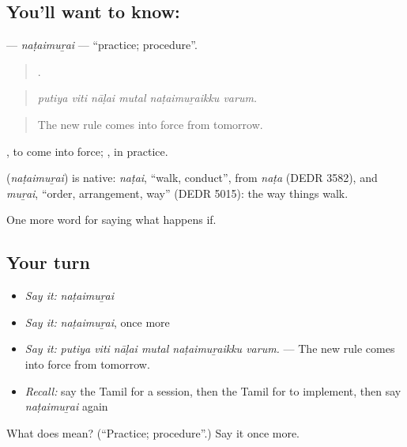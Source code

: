 \subsection*{You'll want to know: }
\textbf{} — \emph{naṭaimuṟai} — \textquotedblleft{}practice; procedure\textquotedblright{}.

\begin{quote}
     .
\end{quote}

\begin{quote}
\emph{putiya viti nāḷai mutal naṭaimuṟaikku varum.}
\end{quote}

\begin{quote}
The new rule comes into force from tomorrow.
\end{quote}

 , to come into force; , in practice.

\begin{cousinweb}
\textbf{} (\emph{naṭaimuṟai}) is native: \emph{naṭai}, \textquotedblleft{}walk, conduct\textquotedblright{}, from \emph{naṭa} (DEDR 3582), and \emph{muṟai}, \textquotedblleft{}order, arrangement, way\textquotedblright{} (DEDR 5015): the way things walk.
\end{cousinweb}

\begin{grammarlens}[title={What you've built}]
One more word for saying what happens if.
\end{grammarlens}

\subsection*{Your turn}
\begin{itemize}
\raggedright
  \item \emph{Say it:} \emph{naṭaimuṟai}
  \item \emph{Say it:} \emph{naṭaimuṟai}, once more
  \item \emph{Say it:} \emph{putiya viti nāḷai mutal naṭaimuṟaikku varum.} — The new rule comes into force from tomorrow.
  \item \emph{Recall:} say the Tamil for a session, then the Tamil for to implement, then say \emph{naṭaimuṟai} again
\end{itemize}

\begin{tcolorbox}[breakable,colback=teal!4,colframe=teal!35!black,title={Before you move on}]
What does  mean? (\textquotedblleft{}Practice; procedure\textquotedblright{}.) Say it once more.
\end{tcolorbox}
